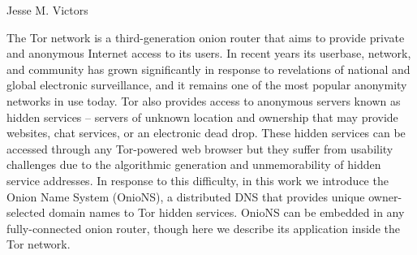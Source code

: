 \begin{publicabstract}
\centerline{Jesse M. Victors}
\vspace{12pt}

The Tor network is a third-generation onion router that aims to provide private and anonymous Internet access to its users. In recent years its userbase, network, and community has grown significantly in response to revelations of national and global electronic surveillance, and it remains one of the most popular anonymity networks in use today. Tor also provides access to anonymous servers known as hidden services -- servers of unknown location and ownership that may provide websites, chat services, or an electronic dead drop. These hidden services can be accessed through any Tor-powered web browser but they suffer from usability challenges due to the algorithmic generation and unmemorability of hidden service addresses. In response to this difficulty, in this work we introduce the Onion Name System (OnioNS), a distributed DNS that provides unique owner-selected domain names to Tor hidden services. OnioNS can be embedded in any fully-connected onion router, though here we describe its application inside the Tor network.

\end{publicabstract}
